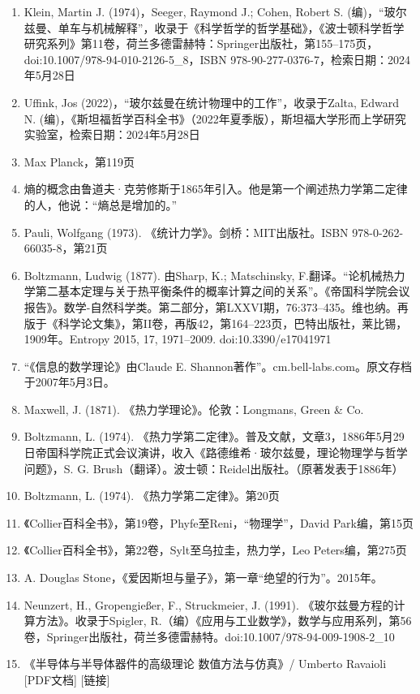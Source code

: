 \begin{enumerate}
\item Klein, Martin J. (1974)，Seeger, Raymond J.; Cohen, Robert S. (编)，“玻尔兹曼、单车与机械解释”，收录于《科学哲学的哲学基础》，《波士顿科学哲学研究系列》第11卷，荷兰多德雷赫特：Springer出版社，第155–175页，doi:10.1007/978-94-010-2126-5_8，ISBN 978-90-277-0376-7，检索日期：2024年5月28日  
\item Uffink, Jos (2022)，“玻尔兹曼在统计物理中的工作”，收录于Zalta, Edward N. (编)，《斯坦福哲学百科全书》（2022年夏季版），斯坦福大学形而上学研究实验室，检索日期：2024年5月28日  
\item Max Planck，第119页  
\item 熵的概念由鲁道夫·克劳修斯于1865年引入。他是第一个阐述热力学第二定律的人，他说：“熵总是增加的。”  
\item Pauli, Wolfgang (1973). 《统计力学》。剑桥：MIT出版社。ISBN 978-0-262-66035-8，第21页  
\item Boltzmann, Ludwig (1877). 由Sharp, K.; Matschinsky, F.翻译。“论机械热力学第二基本定理与关于热平衡条件的概率计算之间的关系”。《帝国科学院会议报告》。数学-自然科学类。第二部分，第LXXVI期，76:373–435。维也纳。再版于《科学论文集》，第II卷，再版42，第164–223页，巴特出版社，莱比锡，1909年。Entropy 2015, 17, 1971–2009. doi:10.3390/e17041971
\item “《信息的数学理论》由Claude E. Shannon著作”。cm.bell-labs.com。原文存档于2007年5月3日。  
\item Maxwell, J. (1871). 《热力学理论》。伦敦：Longmans, Green & Co.  
\item Boltzmann, L. (1974). 《热力学第二定律》。普及文献，文章3，1886年5月29日帝国科学院正式会议演讲，收入《路德维希·玻尔兹曼，理论物理学与哲学问题》，S. G. Brush（翻译）。波士顿：Reidel出版社。（原著发表于1886年）  
\item Boltzmann, L. (1974). 《热力学第二定律》。第20页  
\item 《Collier百科全书》，第19卷，Phyfe至Reni，“物理学”，David Park编，第15页  
\item 《Collier百科全书》，第22卷，Sylt至乌拉圭，热力学，Leo Peters编，第275页  
\item A. Douglas Stone，《爱因斯坦与量子》，第一章“绝望的行为”。2015年。  
\item Neunzert, H., Gropengießer, F., Struckmeier, J. (1991). 《玻尔兹曼方程的计算方法》。收录于Spigler, R.（编）《应用与工业数学》，数学与应用系列，第56卷，Springer出版社，荷兰多德雷赫特。doi:10.1007/978-94-009-1908-2_10  
\item 《半导体与半导体器件的高级理论 数值方法与仿真》/ Umberto Ravaioli [PDF文档] [链接]  

\end{enumerate}
